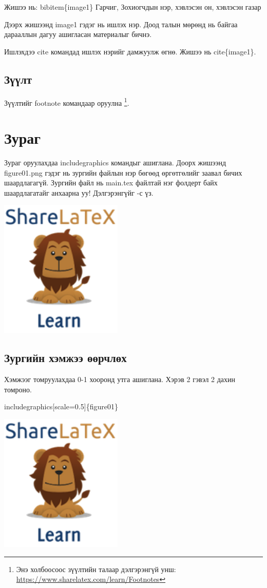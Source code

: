 \documentclass[12pt,A4]{report}
\begin{document}
Жишээ нь: bibitem\{image1\} Гарчиг, Зохиогчдын нэр, хэвлэсэн он, хэвлэсэн газар

Дээрх жишээнд image1 гэдэг нь ишлэх нэр. Доод талын мөрөнд нь байгаа дарааллын дагуу
ашигласан материалыг бичнэ.

Ишлэхдээ cite командад ишлэх нэрийг дамжуулж өгнө. Жишээ нь cite\{image1\}.
\section{Зүүлт}
Зүүлтийг footnote командаар оруулна \footnote{Энэ холбоосоос зүүлтийн талаар дэлгэрэнгүй унш: \url{https://www.sharelatex.com/learn/Footnotes}}.

\chapter{Зураг}
Зураг оруулахдаа includegraphics командыг ашиглана. Доорх жишээнд figure01.png гэдэг нь зургийн файлын нэр бөгөөд өргөтгөлийг заавал бичих шаардлагагүй. Зургийн файл нь main.tex файлтай нэг фолдерт байх шаардлагатайг анхаарна уу! Дэлгэрэнгүйг \cite{image1}-с үз.

\includegraphics{figure01.png}


\section{Зургийн хэмжээ өөрчлөх}
Хэмжээг томруулахдаа 0-1 хооронд утга ашиглана. Хэрэв 2 гэвэл 2 дахин томроно.
\begin{center}
	includegraphics[scale=0.5]\{figure01\}
\end{center}

\includegraphics[scale=0.9]{figure01}
\end{document}
